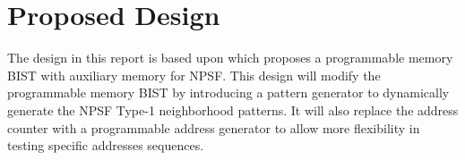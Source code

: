 \chapter{Proposed Design}
\label{chap:design}

The design in this report is based upon \cite{1584083} which proposes a programmable memory BIST with auxiliary memory for NPSF.  This design will modify the programmable memory BIST by introducing a pattern generator to dynamically generate the NPSF Type-1 neighborhood patterns.  It will also replace the address counter with a programmable address generator to allow more flexibility in testing specific addresses sequences.





